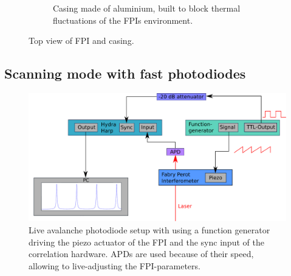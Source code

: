 \begin{figure}[H]
\begin{subfigure}[b]{0.48\textwidth}
		\caption{Casing made of aluminium, built to block thermal fluctuations of the \acp{FPI} environment.}
		\label{fig:casing}
	\end{subfigure}
	\caption{Top view of FPI and casing.}
	\label{fig:topview-casing}
\end{figure}


\subsection{Scanning mode with fast photodiodes}

\begin{figure}[H]
	\centering
	\includegraphics[width=\linewidth]{figures/fabry-perot/live-apd-setup}
	\caption{Live avalanche photodiode setup with using a function generator driving the piezo actuator of the FPI and the sync input of the correlation hardware.
	APDs are used because of their speed, allowing to live-adjusting the FPI-parameters.}
	\label{fig:live-apd-setup}
\end{figure}


